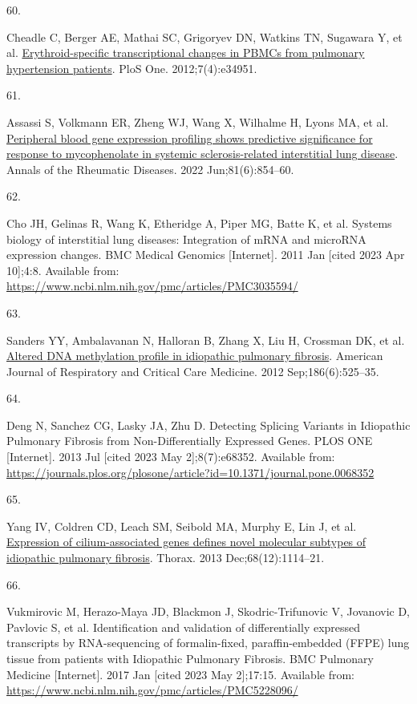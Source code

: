 \documentclass[
]{article}
\newlength{\cslhangindent}
\newlength{\csllabelwidth}
\newenvironment{CSLReferences}[2] %
 {\begin{list}{}{%
  \setlength{\itemindent}{0pt}
  \setlength{\leftmargin}{0pt}
  \setlength{\parsep}{0pt}
  \ifodd #1
   \setlength{\leftmargin}{\cslhangindent}
   \setlength{\itemindent}{-1\cslhangindent}
  \fi
  \setlength{\itemsep}{#2\baselineskip}}}
 {\end{list}}
\newcommand{\CSLLeftMargin}[1]{\parbox[t]{\csllabelwidth}{\strut#1\strut}}
\newcommand{\CSLRightInline}[1]{\parbox[t]{\linewidth - \csllabelwidth}{\strut#1\strut}}
\begin{document}
\begin{CSLReferences}{0}{1}
\CSLLeftMargin{60. }%
\CSLRightInline{Cheadle C, Berger AE, Mathai SC, Grigoryev DN, Watkins TN, Sugawara Y, et al. \href{https://doi.org/10.1371/journal.pone.0034951}{Erythroid-specific transcriptional changes in {PBMCs} from pulmonary hypertension patients}. PloS One. 2012;7(4):e34951. }

\CSLLeftMargin{61. }%
\CSLRightInline{Assassi S, Volkmann ER, Zheng WJ, Wang X, Wilhalme H, Lyons MA, et al. \href{https://doi.org/10.1136/annrheumdis-2021-221313}{Peripheral blood gene expression profiling shows predictive significance for response to mycophenolate in systemic sclerosis-related interstitial lung disease}. Annals of the Rheumatic Diseases. 2022 Jun;81(6):854--60. }

\CSLLeftMargin{62. }%
\CSLRightInline{Cho JH, Gelinas R, Wang K, Etheridge A, Piper MG, Batte K, et al. Systems biology of interstitial lung diseases: Integration of {mRNA} and {microRNA} expression changes. BMC Medical Genomics {[}Internet{]}. 2011 Jan {[}cited 2023 Apr 10{]};4:8. Available from: \url{https://www.ncbi.nlm.nih.gov/pmc/articles/PMC3035594/}}

\CSLLeftMargin{63. }%
\CSLRightInline{Sanders YY, Ambalavanan N, Halloran B, Zhang X, Liu H, Crossman DK, et al. \href{https://doi.org/10.1164/rccm.201201-0077OC}{Altered {DNA} methylation profile in idiopathic pulmonary fibrosis}. American Journal of Respiratory and Critical Care Medicine. 2012 Sep;186(6):525--35. }

\CSLLeftMargin{64. }%
\CSLRightInline{Deng N, Sanchez CG, Lasky JA, Zhu D. Detecting {Splicing} {Variants} in {Idiopathic} {Pulmonary} {Fibrosis} from {Non}-{Differentially} {Expressed} {Genes}. PLOS ONE {[}Internet{]}. 2013 Jul {[}cited 2023 May 2{]};8(7):e68352. Available from: \url{https://journals.plos.org/plosone/article?id=10.1371/journal.pone.0068352}}

\CSLLeftMargin{65. }%
\CSLRightInline{Yang IV, Coldren CD, Leach SM, Seibold MA, Murphy E, Lin J, et al. \href{https://doi.org/10.1136/thoraxjnl-2012-202943}{Expression of cilium-associated genes defines novel molecular subtypes of idiopathic pulmonary fibrosis}. Thorax. 2013 Dec;68(12):1114--21. }

\CSLLeftMargin{66. }%
\CSLRightInline{Vukmirovic M, Herazo-Maya JD, Blackmon J, Skodric-Trifunovic V, Jovanovic D, Pavlovic S, et al. Identification and validation of differentially expressed transcripts by {RNA}-sequencing of formalin-fixed, paraffin-embedded ({FFPE}) lung tissue from patients with {Idiopathic} {Pulmonary} {Fibrosis}. BMC Pulmonary Medicine {[}Internet{]}. 2017 Jan {[}cited 2023 May 2{]};17:15. Available from: \url{https://www.ncbi.nlm.nih.gov/pmc/articles/PMC5228096/}}


\end{CSLReferences}
\end{document}
